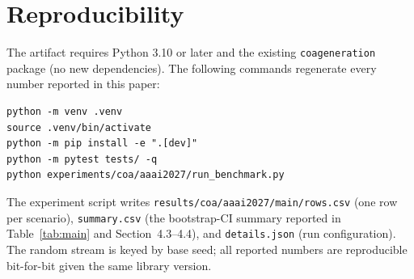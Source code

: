 \documentclass[sigconf]{acmart}
\begin{document}



\appendix

\section{Reproducibility}

The artifact requires Python 3.10 or later and the existing \texttt{coageneration} package (no new dependencies). The following commands regenerate every number reported in this paper:

\begin{verbatim}
python -m venv .venv
source .venv/bin/activate
python -m pip install -e ".[dev]"
python -m pytest tests/ -q
python experiments/coa/aaai2027/run_benchmark.py
\end{verbatim}

The experiment script writes \texttt{results/coa/aaai2027/main/rows.csv} (one row per scenario), \texttt{summary.csv} (the bootstrap-CI summary reported in Table~\ref{tab:main} and Section~4.3--4.4), and \texttt{details.json} (run configuration). The random stream is keyed by base seed; all reported numbers are reproducible bit-for-bit given the same library version.
\end{document}
